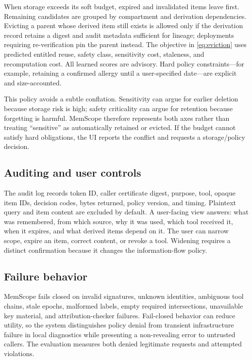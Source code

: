 When storage exceeds its soft budget, expired and invalidated items leave first. Remaining candidates are grouped by compartment and derivation dependencies. Evicting a parent whose derived item still exists is allowed only if the derivation record retains a digest and audit metadata sufficient for lineage; deployments requiring re-verification pin the parent instead. The objective in \cref{eq:eviction} uses predicted entitled reuse, safety class, sensitivity cost, staleness, and recomputation cost. All learned scores are advisory. Hard policy constraints---for example, retaining a confirmed allergy until a user-specified date---are explicit and size-accounted.

This policy avoids a subtle conflation. Sensitivity can argue for earlier deletion because storage risk is high; safety criticality can argue for retention because forgetting is harmful. MemScope therefore represents both axes rather than treating ``sensitive'' as automatically retained or evicted. If the budget cannot satisfy hard obligations, the UI reports the conflict and requests a storage/policy decision.

\subsection{Auditing and user controls}

The audit log records token ID, caller certificate digest, purpose, tool, opaque item IDs, decision codes, bytes returned, policy version, and timing. Plaintext query and item content are excluded by default. A user-facing view answers: what was remembered, from which source, why it was used, which tool received it, when it expires, and what derived items depend on it. The user can narrow scope, expire an item, correct content, or revoke a tool. Widening requires a distinct confirmation because it changes the information-flow policy.

\subsection{Failure behavior}

MemScope fails closed on invalid signatures, unknown identities, ambiguous tool chains, stale epochs, malformed labels, empty required intersections, unavailable key material, and attribution-checker failures. Fail-closed behavior can reduce utility, so the system distinguishes policy denial from transient infrastructure failure in local diagnostics while presenting a non-revealing error to untrusted callers. The evaluation measures both denied legitimate requests and attempted violations.

